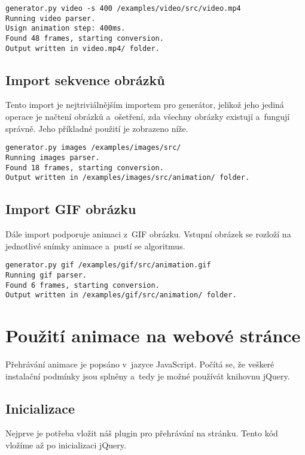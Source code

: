 \begin{lstlisting}
generator.py video -s 400 /examples/video/src/video.mp4
Running video parser.
Usign animation step: 400ms.
Found 48 frames, starting conversion.
Output written in video.mp4/ folder.
\end{lstlisting}


\subsection{Import sekvence obrázků}

Tento import je nejtriviálnějším importem pro generátor, jelikož jeho jediná operace je načtení obrázků a~ošetření, zda všechny obrázky existují a~fungují správně. Jeho příkladné použití je zobrazeno níže.

\begin{lstlisting}
generator.py images /examples/images/src/
Running images parser.
Found 18 frames, starting conversion.
Output written in /examples/images/src/animation/ folder.
\end{lstlisting}

\subsection{Import GIF obrázku}

Dále import podporuje animaci z~GIF obrázku. Vstupní obrázek se rozloží na jednotlivé snímky animace a~pustí se algoritmus.

\begin{lstlisting}
generator.py gif /examples/gif/src/animation.gif
Running gif parser.
Found 6 frames, starting conversion.
Output written in /examples/gif/src/animation/ folder.
\end{lstlisting}

\section{Použití animace na webové stránce}

Přehrávání animace je popsáno v~jazyce JavaScript. Počítá se, že veškeré instalační podmínky jsou splněny a~tedy je možné používát knihovnu jQuery.

\subsection{Inicializace}

Nejprve je potřeba vložit náš plugin pro přehrávání na stránku. Tento kód vložíme až po inicializaci jQuery.


